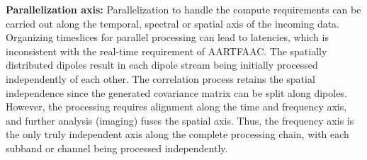 \documentclass{ws-jai}
\begin{document}




\noindent \textbf  {Parallelization axis:}  Parallelization to handle  the compute
requirements can be carried out along  the temporal, spectral or spatial axis of
the incoming  data.  Organizing timeslices  for parallel processing can  lead to
latencies, which is inconsistent with the real-time requirement of AARTFAAC. The
spatially  distributed dipoles  result  in each  dipole  stream being  initially
processed  independently of  each other.   The correlation  process retains  the
spatial independence  since the generated  covariance matrix can be  split along
dipoles.   However,  the  processing  requires  alignment  along  the  time  and
frequency axis,  and further analysis  (imaging) fuses the spatial  axis.  Thus,
the  frequency axis  is  the  only truly  independent  axis  along the  complete
processing chain, with each subband or channel being processed independently.
\end{document}
